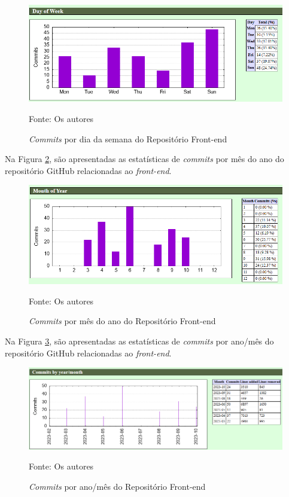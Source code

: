 \begin{apendicesenv}
\begin{figure}[H]
	\centering
	\includegraphics[scale=0.7]{./imagens/metricas/gitStatsFrontend/activity/dayOfWeek.png}
	\caption{\textit{Commits} por dia da semana do Repositório Front-end}
	Fonte: Os autores
    \label{dayOfWeekFrontend}
\end{figure}
\pagebreak

Na Figura \ref{monthOfYearFrontend}, são apresentadas as estatísticas de \textit{commits} por mês do ano do repositório GitHub relacionadas ao \textit{front-end}.

\begin{figure}[H]
	\centering
	\includegraphics[scale=0.7]{./imagens/metricas/gitStatsFrontend/activity/monthOfYear.png}
	\caption{\textit{Commits} por mês do ano do Repositório Front-end}
	Fonte: Os autores
    \label{monthOfYearFrontend}
\end{figure}

Na Figura \ref{commitsFrontend}, são apresentadas as estatísticas de \textit{commits} por ano/mês do repositório GitHub relacionadas ao \textit{front-end}.

\begin{figure}[H]
	\centering
	\includegraphics[scale=0.6]{./imagens/metricas/gitStatsFrontend/activity/commits.png}
	\caption{\textit{Commits} por ano/mês do Repositório Front-end}
	Fonte: Os autores
    \label{commitsFrontend}
\end{figure}
\pagebreak


\end{apendicesenv}

